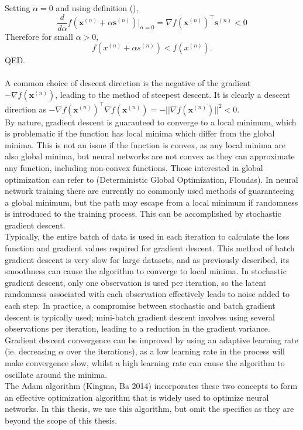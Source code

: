 \documentclass[a4paper,12pt]{article}
\numberwithin{equation}{section}
\begin{document}
Setting $\alpha=0$ and using definition (),
\[\frac{d}{d\alpha}f(\bm{x}^{(n)}+\alpha\bm{s}^{(n)})|_{\alpha=0}=\nabla f(\bm{x}^{(n)})^\top \bm{s}^{(n)}<0\]
Therefore for small $\alpha>0$,
\[f(x^{(n)}+\alpha s^{(n)})<f(x^{(n)}).\]
QED.\\
\\
A common choice of descent direction is the negative of the gradient $-\nabla f(\bm{x}^{(n)})$, leading to the method of steepest descent. It is clearly a descent direction as $-\nabla f(\bm{x}^{(n)})^\top\nabla f(\bm{x}^{(n)})=-||\nabla f(\bm{x}^{(n)})||^2<0$.\\
By nature, gradient descent is guaranteed to converge to a local minimum, which is problematic if the function has local minima which differ from the global minima. This is not an issue if the function is convex, as any local minima are also global minima, but neural networks are not convex as they can approximate any function, including non-convex functions. Those interested in global optimization can refer to (Deterministic Global Optimization, Floudas). In neural network training there are currently no commonly used methods of guaranteeing a global minimum, but the path may escape from a local minimum if randomness is introduced to the training process. This can be accomplished by stochastic gradient descent.\\
Typically, the entire batch of data is used in each iteration to calculate the loss function and gradient values required for gradient descent. This method of batch gradient descent is very slow for large datasets, and as previously described, its smoothness can cause the algorithm to converge to local minima. In stochastic gradient descent, only one observation is used per iteration, so the latent randomness associated with each observation effectively leads to noise added to each step. In practice, a compromise between stochastic and batch gradient descent is typically used; mini-batch gradient descent involves using several observations per iteration, leading to a reduction in the gradient variance.\\
Gradient descent convergence can be improved by using an adaptive learning rate (ie. decreasing $\alpha$ over the iterations), as a low learning rate in the process will make convergence slow, whilst a high learning rate can cause the algorithm to oscillate around the minima.\\
The Adam algorithm (Kingma, Ba 2014) incorporates these two concepts to form an effective optimization algorithm that is widely used to optimize neural networks. In this thesis, we use this algorithm, but omit the specifics as they are beyond the scope of this thesis.
\newpage
\end{document}
